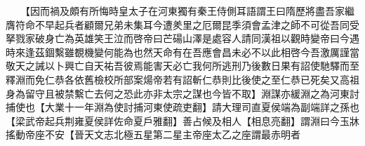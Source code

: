 　　【因而禍及頗有所悔時皇太子在河東獨有秦王侍側耳語謂王曰隋歷將盡吾家繼膺符命不早起兵者顧爾兄弟未集耳今遭羑里之厄爾昆季須會孟津之師不可從吾同受拏戮家破身亡為英雄笑王泣而啓帝曰芒碭山澤是處容人請同漢祖以觀時變帝曰今遇時來逢茲錮繫雖覩機變何能為也然天命有在吾應會昌未必不以此相啓今吾激厲謹當敬天之誡以卜興亡自天祐吾彼焉能害天必亡我何所逃刑乃後數日果有詔使馳驛而至釋淵而免仁恭各依舊檢校所部案煬帝若有詔斬仁恭則比後使之至仁恭已死矣又高祖身為留守且被禁繫亡去何之恐此亦非太宗之謀也今皆不取】淵謀亦緩淵之為河東討捕使也【大業十一年淵為使討捕河東使疏吏翻】請大理司直夏侯端為副端詳之孫也【梁武帝起兵荆雍夏侯詳佐命夏戶雅翻】善占候及相人【相息亮翻】謂淵曰今玉牀搖動帝座不安【晉天文志北極五星第二星主帝座太乙之座謂最赤明者